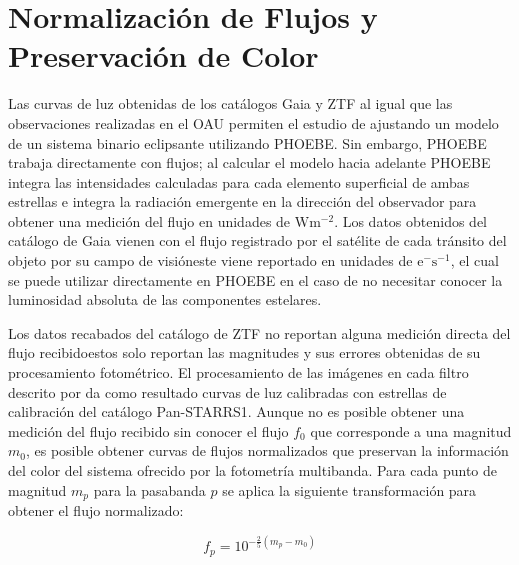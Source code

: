 \chapter{Normalización de Flujos y Preservación de Color} \label{Metodologia:NormalizacionFlujos}

Las curvas de luz obtenidas de los catálogos Gaia y ZTF al igual que las
observaciones realizadas en el OAU permiten el estudio de \atoObjId ajustando un
modelo de un sistema binario eclipsante utilizando PHOEBE. Sin embargo, PHOEBE
trabaja directamente con flujos; al calcular el modelo hacia adelante PHOEBE
integra las intensidades calculadas para cada elemento superficial de ambas
estrellas e integra la radiación emergente en la dirección del observador para
obtener una medición del flujo en unidades de $\mathrm{W} \mathrm{m}^{-2}$. Los
datos obtenidos del catálogo de Gaia vienen con el flujo registrado por el
satélite de cada tránsito del objeto por su campo de visión\textemdash este
viene reportado en unidades de $\mathrm{e}^{-} \mathrm{s}^{-1}$, el cual se
puede utilizar directamente en PHOEBE en el caso de no necesitar conocer la
luminosidad absoluta de las componentes estelares. 

Los datos recabados del catálogo de ZTF no reportan alguna medición directa del
flujo recibido\textemdash estos solo reportan las magnitudes y sus errores
obtenidas de su procesamiento fotométrico. El procesamiento de las imágenes en
cada filtro descrito por
 da como
resultado curvas de luz calibradas con estrellas de calibración del catálogo
Pan-STARRS1. Aunque no es posible obtener una medición del flujo recibido sin
conocer el flujo $f_0$ que corresponde a una magnitud $m_0$, es posible obtener
curvas de flujos normalizados que preservan la información del color del sistema
ofrecido por la fotometría multibanda. Para cada punto de magnitud $m_p$ para la
pasabanda $p$ se aplica la siguiente transformación para obtener el flujo
normalizado:

\begin{eqfloat}[!ht]
	\centering
	\begin{equation}
		f_p = 10^{-\frac{2}{5} (m_p - m_0)}
	\end{equation}
	\blankcaption
	\label{ecuacionNormalizarFlujos}
\end{eqfloat}

